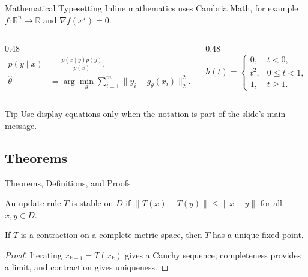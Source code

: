 \documentclass[10pt,aspectratio=169]{virgiling-slides}
\begin{document}
\begin{frame}{Mathematical Typesetting}
  Inline mathematics uses Cambria Math, for example
  $f\colon \mathbb{R}^n \to \mathbb{R}$ and $\nabla f(x^\star)=0$.

  \begin{columns}[T,onlytextwidth]
    \begin{column}{0.48\textwidth}
      \begin{align*}
        p(y\mid x)
          &= \frac{p(x\mid y)p(y)}{p(x)}, \\
        \widehat{\theta}
          &= \arg\min_{\theta}\sum_{i=1}^{m}
             \lVert y_i-g_{\theta}(x_i)\rVert_2^2.
      \end{align*}
    \end{column}
    \begin{column}{0.48\textwidth}
      \[
        h(t)=
        \begin{cases}
          0, & t < 0,\\
          t^2, & 0 \leq t < 1,\\
          1, & t \geq 1.
        \end{cases}
      \]
    \end{column}
  \end{columns}

  \begin{block}{Tip}
    Use display equations only when the notation is part of the slide's main message.
  \end{block}
\end{frame}

\subsection{Theorems}

\begin{frame}{Theorems, Definitions, and Proofs}
  \begin{definition}
    An update rule $T$ is stable on $D$ if
    $\lVert T(x)-T(y)\rVert \leq \lVert x-y\rVert$ for all $x,y\in D$.
  \end{definition}

  \begin{theorem}
    If $T$ is a contraction on a complete metric space, then $T$ has a unique
    fixed point.
  \end{theorem}

  \begin{proof}
    Iterating $x_{k+1}=T(x_k)$ gives a Cauchy sequence; completeness provides a
    limit, and contraction gives uniqueness.
  \end{proof}
\end{frame}
\end{document}
